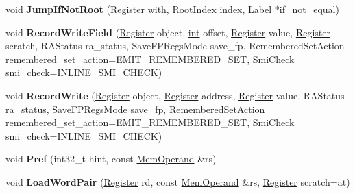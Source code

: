 \begin{DoxyCompactItemize}
void {\bfseries Jump\+If\+Not\+Root} (\mbox{\hyperlink{classv8_1_1internal_1_1Register}{Register}} with, Root\+Index index, \mbox{\hyperlink{classv8_1_1internal_1_1Label}{Label}} $\ast$if\+\_\+not\+\_\+equal)
\item 
\mbox{\label{classv8_1_1internal_1_1MacroAssembler_a4fd74303402ac28fb5ee591cbd10bd1f}} 
void {\bfseries Record\+Write\+Field} (\mbox{\hyperlink{classv8_1_1internal_1_1Register}{Register}} object, \mbox{\hyperlink{classint}{int}} offset, \mbox{\hyperlink{classv8_1_1internal_1_1Register}{Register}} value, \mbox{\hyperlink{classv8_1_1internal_1_1Register}{Register}} scratch, R\+A\+Status ra\+\_\+status, Save\+F\+P\+Regs\+Mode save\+\_\+fp, Remembered\+Set\+Action remembered\+\_\+set\+\_\+action=E\+M\+I\+T\+\_\+\+R\+E\+M\+E\+M\+B\+E\+R\+E\+D\+\_\+\+S\+ET, Smi\+Check smi\+\_\+check=I\+N\+L\+I\+N\+E\+\_\+\+S\+M\+I\+\_\+\+C\+H\+E\+CK)
\item 
\mbox{\label{classv8_1_1internal_1_1MacroAssembler_a54e3055e56df32a38831faf3010e37f8}} 
void {\bfseries Record\+Write} (\mbox{\hyperlink{classv8_1_1internal_1_1Register}{Register}} object, \mbox{\hyperlink{classv8_1_1internal_1_1Register}{Register}} address, \mbox{\hyperlink{classv8_1_1internal_1_1Register}{Register}} value, R\+A\+Status ra\+\_\+status, Save\+F\+P\+Regs\+Mode save\+\_\+fp, Remembered\+Set\+Action remembered\+\_\+set\+\_\+action=E\+M\+I\+T\+\_\+\+R\+E\+M\+E\+M\+B\+E\+R\+E\+D\+\_\+\+S\+ET, Smi\+Check smi\+\_\+check=I\+N\+L\+I\+N\+E\+\_\+\+S\+M\+I\+\_\+\+C\+H\+E\+CK)
\item 
\mbox{\label{classv8_1_1internal_1_1MacroAssembler_ae3c72e87f68dad4e9ea3e6f2d4d66dc7}} 
void {\bfseries Pref} (int32\+\_\+t hint, const \mbox{\hyperlink{classv8_1_1internal_1_1MemOperand}{Mem\+Operand}} \&rs)
\item 
\mbox{\label{classv8_1_1internal_1_1MacroAssembler_aa5ac822fa7e2275951d7c3359478f7e5}} 
void {\bfseries Load\+Word\+Pair} (\mbox{\hyperlink{classv8_1_1internal_1_1Register}{Register}} rd, const \mbox{\hyperlink{classv8_1_1internal_1_1MemOperand}{Mem\+Operand}} \&rs, \mbox{\hyperlink{classv8_1_1internal_1_1Register}{Register}} scratch=at)
\item 
\mbox{\label{classv8_1_1internal_1_1MacroAssembler_acf3bca08bd89268a613e0a128660a297}} 

\end{DoxyCompactItemize}
